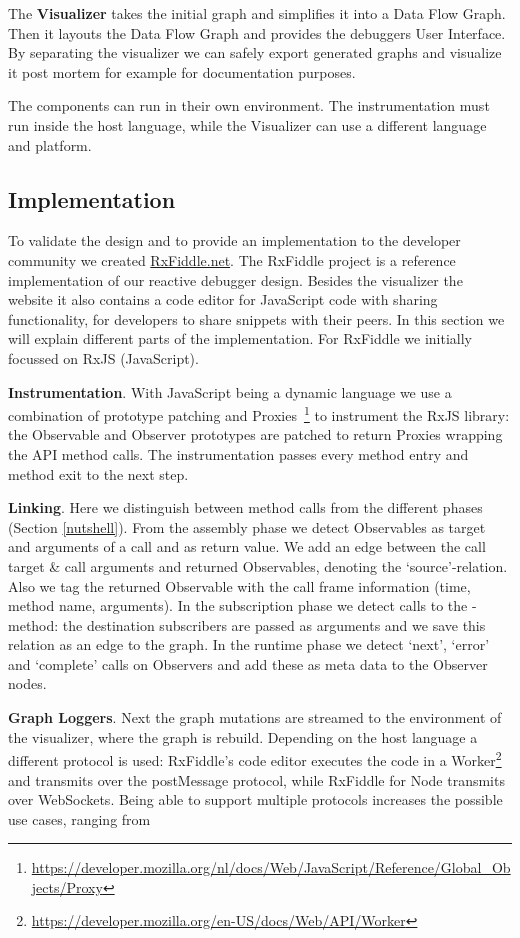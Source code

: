 The \textbf{Visualizer} takes the initial graph and simplifies it into a Data Flow Graph. Then it layouts the Data Flow Graph and provides the debuggers User Interface. By separating the visualizer we can safely export generated graphs and visualize it post mortem for example for documentation purposes.

The components can run in their own environment. The instrumentation must run inside the host language, while the Visualizer can use a different language and platform.

\subsection{Implementation}
To validate the design and to provide an implementation to the developer community we created \url{RxFiddle.net}. The RxFiddle project is a reference implementation of 
our reactive debugger design. Besides the visualizer the website it also contains a code editor for JavaScript code with sharing functionality, for developers to share snippets with their peers. In this section we will explain different parts of the implementation. For RxFiddle we initially focussed on RxJS (JavaScript).

\textbf{Instrumentation}. With JavaScript being a dynamic language we use a combination of prototype patching and Proxies~\footnote{\url{https://developer.mozilla.org/nl/docs/Web/JavaScript/Reference/Global_Objects/Proxy}} to instrument the RxJS library: the Observable and Observer prototypes are patched to return Proxies wrapping the API method calls. The instrumentation passes every method entry and method exit to the next step.

\textbf{Linking}. Here we distinguish between method calls from the different phases (Section \ref{nutshell}). From the assembly phase we detect Observables as target and arguments of a call and as return value. We add an edge between the call target \& call arguments and returned Observables, denoting the `source'-relation. Also we tag the returned Observable with the call frame information (time, method name, arguments). In the subscription phase we detect calls to the -method: the destination subscribers are passed as arguments and we save this relation as an edge to the graph. In the runtime phase we detect `next', `error' and `complete' calls on Observers and add these as meta data to the Observer nodes.

\textbf{Graph Loggers}. Next the graph mutations are streamed to the environment of the visualizer, where the graph is rebuild. Depending on the host language a different protocol is used: RxFiddle's code editor executes the code in a Worker\footnote{\url{https://developer.mozilla.org/en-US/docs/Web/API/Worker}} and transmits over the postMessage protocol, while RxFiddle for Node transmits over WebSockets. Being able to support multiple protocols increases the possible use cases, ranging from 


